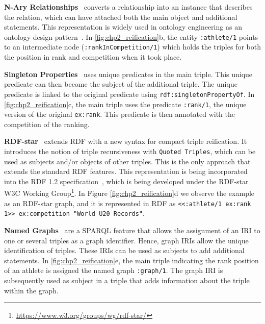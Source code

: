 \noindent\textbf{N-Ary Relationships}~\parencite{naryw3c2006} converts a relationship into an instance that describes the relation, which can have attached both the main object and additional statements.
This representation is widely used in ontology engineering as an ontology design pattern~\parencite{gangemi2013multi}. In \cref{fig:chp2_reification}b, the entity \texttt{:athlete/1} points to an intermediate node (\texttt{:rankInCompetition/1}) which holds the triples for both the position in rank and competition when it took place.

\noindent\textbf{Singleton Properties}~\parencite{nguyen2014don} uses unique predicates in the main triple. This unique predicate can then become the subject of the additional triple. The unique predicate is linked to the original predicate using \texttt{rdf:singletonPropertyOf}.
In \cref{fig:chp2_reification}c, the main triple uses the predicate \texttt{:rank/1}, the unique version of the original \texttt{ex:rank}. This predicate is then annotated with the competition of the ranking. 

\noindent\textbf{RDF-star}~\parencite{hartig2017foundations,hartig2023rdf} extends RDF with a new syntax for compact triple reification. 
It introduces the notion of triple recursiveness with \texttt{Quoted Triples}, which can be used as subjects and/or objects of other triples. This is the only approach that extends the standard RDF features. 
This representation is being incorporated into the RDF 1.2 specification~\parencite{hartig2023rdf}, which is being developed under the RDF-star W3C Working Group\footnote{\url{https://www.w3.org/groups/wg/rdf-star/}}.
In Figure \ref{fig:chp2_reification}d we observe the example as an RDF-star graph, and it is represented in RDF as \texttt{{<<:athlete/1 ex:rank 1>> ex:competition "World U20 Records"}}.


\noindent\textbf{Named Graphs}~\parencite{sparql2008} are a SPARQL feature that allows the assignment of an IRI to one or several triples as a graph identifier. Hence, graph IRIs allow the unique identification of triples. These IRIs can be used as subjects to add additional statements. 
In \cref{fig:chp2_reification}e, the main triple indicating the rank position of an athlete is assigned the named graph \texttt{:graph/1}. The graph IRI is subsequently used as subject in a triple that adds information about the triple within the graph. 
